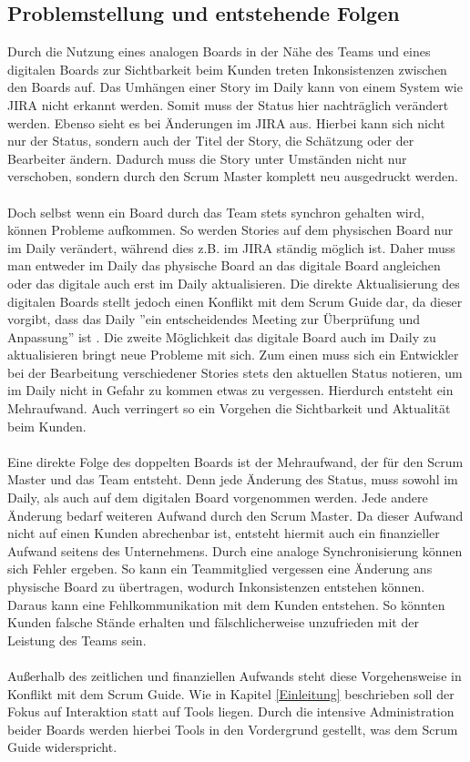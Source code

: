 \documentclass[12pt,titlepage]{scrartcl}
\begin{document}
		\subsection{Problemstellung und entstehende Folgen} \label{Problemstellung}
		Durch die Nutzung eines analogen Boards in der Nähe des Teams und eines digitalen Boards zur Sichtbarkeit beim Kunden treten Inkonsistenzen zwischen den Boards auf. Das Umhängen einer Story im Daily kann von einem System wie JIRA nicht erkannt werden. Somit muss der Status hier nachträglich verändert werden. Ebenso sieht es bei Änderungen im JIRA aus. Hierbei kann sich nicht nur der Status, sondern auch der Titel der Story, die Schätzung oder der Bearbeiter ändern. Dadurch muss die Story unter Umständen nicht nur verschoben, sondern durch den Scrum Master komplett neu ausgedruckt werden. \\ \\
		Doch selbst wenn ein Board durch das Team stets synchron gehalten wird, können Probleme aufkommen. So werden Stories auf dem physischen Board nur im Daily verändert, während dies z.B. im JIRA ständig möglich ist. Daher muss man entweder im Daily das physische Board an das digitale Board angleichen oder das digitale auch erst im Daily aktualisieren. Die direkte Aktualisierung des digitalen Boards stellt jedoch einen Konflikt mit dem Scrum Guide dar, da dieser vorgibt, dass das Daily ''ein entscheidendes Meeting zur Überprüfung und Anpassung'' ist \cite{guide}. Die zweite Möglichkeit das digitale Board auch im Daily zu aktualisieren bringt neue Probleme mit sich. Zum einen muss sich ein Entwickler bei der Bearbeitung verschiedener Stories stets den aktuellen Status notieren, um im Daily nicht in Gefahr zu kommen etwas zu vergessen. Hierdurch entsteht ein Mehraufwand. Auch verringert so ein Vorgehen die Sichtbarkeit und Aktualität beim Kunden.	
		\\ \\
		Eine direkte Folge des doppelten Boards ist der Mehraufwand, der für den Scrum Master und das Team entsteht. Denn jede Änderung des Status, muss sowohl im Daily, als auch auf dem digitalen Board vorgenommen werden. Jede andere Änderung bedarf weiteren Aufwand durch den Scrum Master. Da dieser Aufwand nicht auf einen Kunden abrechenbar ist, entsteht hiermit auch ein finanzieller Aufwand seitens des Unternehmens. Durch eine analoge Synchronisierung können sich Fehler ergeben. So kann ein Teammitglied vergessen eine Änderung ans physische Board zu übertragen, wodurch Inkonsistenzen entstehen können. Daraus kann eine Fehlkommunikation mit dem Kunden entstehen. So könnten Kunden falsche Stände erhalten und fälschlicherweise unzufrieden mit der Leistung des Teams sein. \\ \\
		Außerhalb des zeitlichen und finanziellen Aufwands steht diese Vorgehensweise in Konflikt mit dem Scrum Guide. Wie in Kapitel \ref{Einleitung} beschrieben soll der Fokus auf Interaktion statt auf Tools liegen. Durch die intensive Administration beider Boards werden hierbei Tools in den Vordergrund gestellt, was dem Scrum Guide widerspricht.
\end{document}
